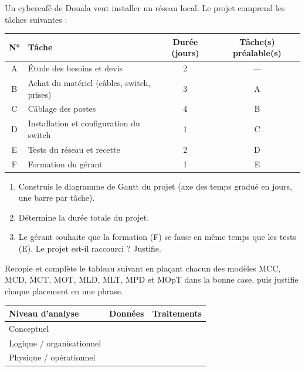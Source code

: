 \documentclass[11pt]{article}
\begin{document}
\begin{exercice}
Un cybercafé de Douala veut installer un réseau local. Le projet comprend les tâches suivantes :
\begin{center}
\begin{tabularx}{\linewidth}{|c|X|c|c|}
\hline
\rowcolor{popblueL} \textbf{N°} & \textbf{Tâche} & \textbf{Durée (jours)} & \textbf{Tâche(s) préalable(s)} \\
\hline
A & Étude des besoins et devis & 2 & — \\
\hline
B & Achat du matériel (câbles, switch, prises) & 3 & A \\
\hline
C & Câblage des postes & 4 & B \\
\hline
D & Installation et configuration du switch & 1 & C \\
\hline
E & Tests du réseau et recette & 2 & D \\
\hline
F & Formation du gérant & 1 & E \\
\hline
\end{tabularx}
\end{center}
\begin{enumerate}
  \item Construis le diagramme de Gantt du projet (axe des temps gradué en jours, une barre par tâche).
  \item Détermine la durée totale du projet.
  \item Le gérant souhaite que la formation (F) se fasse en même temps que les tests (E). Le projet est-il raccourci ? Justifie.
\end{enumerate}
\end{exercice}

\begin{exercice}
Recopie et complète le tableau suivant en plaçant chacun des modèles MCC, MCD, MCT, MOT, MLD, MLT, MPD et MOpT dans la bonne case, puis justifie chaque placement en une phrase.
\begin{center}
\begin{tabularx}{\linewidth}{|l|X|X|}
\hline
\rowcolor{popblueL} \textbf{Niveau d'analyse} & \textbf{Données} & \textbf{Traitements} \\
\hline
Conceptuel & & \\
\hline
Logique / organisationnel & & \\
\hline
Physique / opérationnel & & \\
\hline
\end{tabularx}
\end{center}
\end{exercice}
\end{document}
